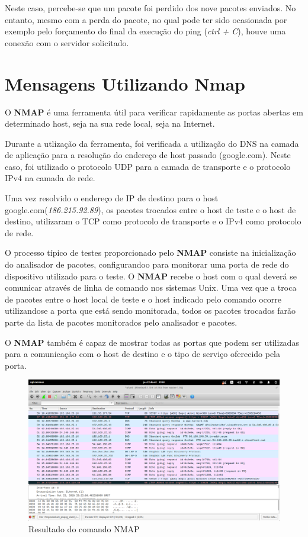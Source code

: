 Neste caso, percebe-se que um pacote foi perdido dos nove pacotes enviados. No entanto, mesmo com a perda do pacote, no qual pode ter sido ocasionada por exemplo pelo forçamento do final da execução do ping (\emph{ctrl + C}), houve uma conexão com o servidor solicitado.


\section{Mensagens Utilizando Nmap}

O \textbf{NMAP} é uma ferramenta útil para verificar rapidamente as portas abertas em determinado host, seja na sua rede local, seja na Internet.

Durante a utlização da ferramenta, foi verificada a utilização do DNS na camada de aplicação para a resolução do endereço de host passado (google.com). Neste caso, foi utilizado o protocolo UDP para a camada de transporte e o protocolo IPv4 na camada de rede.

Uma vez resolvido o endereço de IP de destino para o host google.com(\emph{186.215.92.89}), os pacotes trocados entre o host de teste e o host de destino, utilizaram o TCP como protocolo de transporte e o IPv4 como protocolo de rede.

O processo típico de testes proporcionado pelo \textbf{NMAP} consiste na inicialização do analisador de pacotes, configurando­o para monitorar uma porta de rede do dispositivo utilizado para o teste. O \textbf{NMAP} recebe o host com o qual deverá se comunicar através de linha de comando nos sistemas Unix. Uma vez que a troca de pacotes entre o host local de teste e o host indicado pelo comando ocorre utilizando­se a porta que está sendo monitorada, todos os pacotes trocados farão parte da lista de pacotes monitorados pelo analisador e pacotes.

O \textbf{NMAP} também é capaz de mostrar todas as portas que podem ser utilizadas para a comunicação com o host de destino e o tipo de serviço oferecido pela porta.

\begin{figure}[h]
    \centering

    \includegraphics[width=450px, scale=1]{figuras/ping}
    \caption{Resultado do comando NMAP}

 \label{fig:nmap}
  \end{figure}

